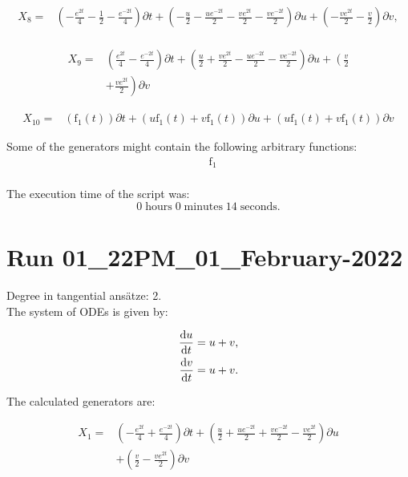 \begin{align*}
X_{8}=&\left(- \frac{e^{2 t}}{4} - \frac{1}{2} - \frac{e^{- 2 t}}{4} \right)\partial t+\left(- \frac{u}{2} - \frac{u e^{- 2 t}}{2} - \frac{v e^{2 t}}{2} - \frac{v e^{- 2 t}}{2} \right)\partial u+\left(- \frac{v e^{2 t}}{2} - \frac{v}{2} \right)\partial v,\\
\end{align*}

\begin{align*}
X_{9}=&\left(\frac{e^{2 t}}{4} - \frac{e^{- 2 t}}{4} \right)\partial t+\left(\frac{u}{2}+\frac{v e^{2 t}}{2}- \frac{u e^{- 2 t}}{2}- \frac{v e^{- 2 t}}{2} \right)\partial u+\left(\frac{v}{2}\right.\\
&+\left.\frac{v e^{2 t}}{2} \right)\partial v
\end{align*}

\begin{align*}
X_{10}=&\left(\operatorname{f_{1}}{\left(t \right)} \right)\partial t+\left(u \operatorname{f_{1}}{\left(t \right)}+v \operatorname{f_{1}}{\left(t \right)} \right)\partial u+\left(u \operatorname{f_{1}}{\left(t \right)}+v \operatorname{f_{1}}{\left(t \right)} \right)\partial v
\end{align*}



\noindent Some of the generators might contain the following arbitrary functions:
\begin{align*}
&\operatorname{f_{1}}\\
\end{align*}

\noindent The execution time of the script was:
$$0\;\mathrm{hours}\;0\;\mathrm{minutes}\;14 \;\mathrm{seconds}.$$
\section*{Run 01\_22PM\_01\_February-2022}
Degree in tangential ansätze:	2.\\
The system of ODEs is given by:

\begin{align*}
\dv{u}{t}&=u + v,\\
\dv{v}{t}&=u + v.\\
\end{align*}

\noindent The calculated generators are:

\begin{align*}
X_{1}=&\left(- \frac{e^{2 t}}{4}+\frac{e^{- 2 t}}{4} \right)\partial t+\left(\frac{u}{2}+\frac{u e^{- 2 t}}{2}+\frac{v e^{- 2 t}}{2}- \frac{v e^{2 t}}{2} \right)\partial u\\
&+\left(\frac{v}{2}- \frac{v e^{2 t}}{2} \right)\partial v
\end{align*}

